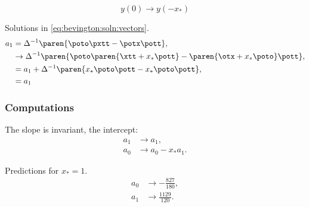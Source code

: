   \begin{equation*}   %
    y(0) \rightarrow y(-x_{*})
  \end{equation*}

Solutions in \eqref{eq:bevington:soln:vectors}.
  \begin{equation*}   %
    \begin{split}
      a_{1} &= \Delta^{-1} \paren{\poto \pxtt -
               \potx \pott}, \\
            &\rightarrow \Delta^{-1} \paren{\poto \paren{\xtt + x_{*} \pott} -
               \paren{\otx + x_{*} \poto} \pott}, \\
            &= a_{1} + \Delta^{-1} \paren{x_{*} \poto \pott - x_{*}\poto\pott}, \\
            &= a_{1} 
    \end{split}
  \end{equation*}

\subsubsection{Computations}  %

The slope is invariant, the intercept:
  \begin{equation*}   %
    \begin{split}
      a_{1} & \rightarrow a_{1}, \\
      a_{0} & \rightarrow a_{0} - x_{*} a_{1}.
    \end{split}
  \end{equation*}

Predictions for $x_{*} = 1$. 
  \begin{equation}   %
    \begin{split}
      a_{0} & \rightarrow -\frac{827}  {180}, \\
      a_{1} & \rightarrow  \frac{1129} {120}.
    \label{eq:bev:prediction}
    \end{split}
  \end{equation}

